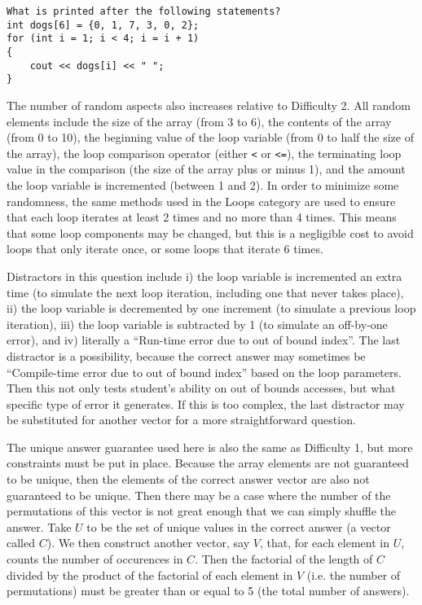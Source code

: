 \documentclass{article}
\begin{document}
\begin{lstlisting}
What is printed after the following statements?
int dogs[6] = {0, 1, 7, 3, 0, 2}; 
for (int i = 1; i < 4; i = i + 1) 
{ 
	cout << dogs[i] << " ";
} 
\end{lstlisting}

The number of random aspects also increases relative to Difficulty 2. All random elements include the size of the array (from 3 to 6), the contents of the array (from 0 to 10), the beginning value
of the loop variable (from 0 to half the size of the array), the loop comparison operator (either \verb;<; or \verb;<=;), the terminating loop value in the comparison (the size of the array 
plus or minus 1), and the amount the loop variable is incremented (between 1 and 2). In order to minimize some randomness, the same methods used in the Loops category are used to ensure
that each loop iterates at least 2 times and no more than 4 times. This means that some loop components may be changed, but this is a negligible cost to avoid loops that only iterate once, or 
some loops that iterate 6 times.

Distractors in this question include i) the loop variable is incremented an extra time (to simulate the next loop iteration, including one that never takes place), ii) the loop variable is decremented by one increment (to simulate a previous loop iteration), iii) the loop variable is subtracted by 1 (to simulate an off-by-one error), and iv) literally a ``Run-time error due to out of bound index''.
The last distractor is a possibility, because the correct answer may sometimes be ``Compile-time error due to out of bound index'' based on the loop parameters. Then this not only tests 
student's ability on out of bounds accesses, but what specific type of error it generates. If this is too complex, the last distractor may be substituted for another vector for a more straightforward
question.

The unique answer guarantee used here is also the same as Difficulty 1, but more constraints must be put in place. Because the array elements are not guaranteed to be unique, then the
elements of the correct answer vector are also not guaranteed to be unique. Then there may be a case where the number of the permutations of this vector is not great enough that we can simply shuffle 
the answer. Take $ U $ to be the set of unique values in the correct answer (a vector called $ C $). We then construct another vector, say $ V $, that, for each element in $ U $, counts the number of occurences in $ C $.  Then the factorial of the length of $ C $ divided by the product of the factorial of each element in $ V $ 
 (i.e. the number of permutations) must be greater than or equal to 5 (the total number of answers).
\end{document}
